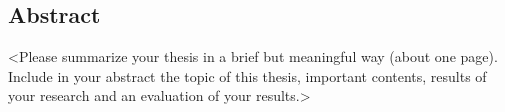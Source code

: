 %
\pagestyle{empty}

\subsection*{Abstract}

<Please summarize your thesis in a brief but meaningful way (about one page). Include in your abstract the topic of this thesis, important contents, results of your research and an evaluation of your results.>

\cleardoublepage
